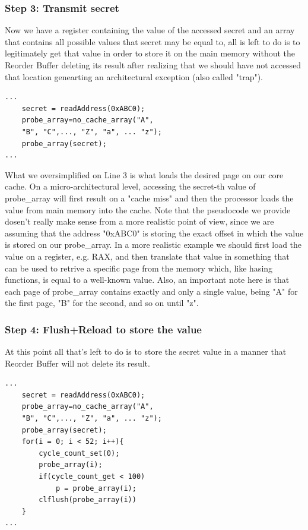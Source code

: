 \subsubsection{Step 3: Transmit secret}
Now we have a register containing the value of the accessed secret and an array that contains all possible values that secret may be equal to,
all is left to do is to legitimately get that value in order to store it on the main memory without the Reorder Buffer deleting its result
after realizing that we should have not accessed that location genearting an architectural exception (also called "trap").

\begin{Verbatim}[fontsize=\small]
...
    secret = readAddress(0xABC0);
    probe_array=no_cache_array("A",
	"B", "C",..., "Z", "a", ... "z");
    probe_array(secret);
...
\end{Verbatim}

What we oversimplified on Line 3 is what loads the desired page on our core cache. On a micro-architectural level, accessing the secret-th value of probe\_array
will first result on a "cache miss" and then the processor loads the value from main memory into the cache.
Note that the pseudocode we provide dosen't really make sense from a more realistic point of view, since we are assuming that the address "0xABC0" is storing the exact
offset in which the value is stored on our probe\_array. In a more realistic example we should first load the value on a register, e.g. RAX,
and then translate that value in something that can be used to retrive a specific page from the memory which,
like hasing functions, is equal to a well-known value. Also, an important note here is that each page
of probe\_array contains exactly and only a single value, being "A" for the first page, "B" for the second, and so on until "z".

\subsubsection{Step 4: Flush+Reload to store the value}
At this point all that's left to do is to store the secret value in a manner that Reorder Buffer will not delete its result.
\begin{Verbatim}[fontsize=\small]
...
    secret = readAddress(0xABC0);
    probe_array=no_cache_array("A",
	"B", "C",..., "Z", "a", ... "z");
    probe_array(secret);
    for(i = 0; i < 52; i++){
        cycle_count_set(0);
        probe_array(i);
        if(cycle_count_get < 100)
            p = probe_array(i);
        clflush(probe_array(i))
    }
...
\end{Verbatim}


